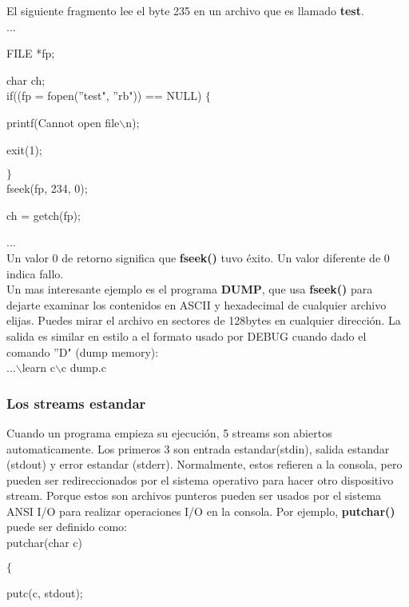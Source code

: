 \documentclass[]{article}
\begin{document}
	El siguiente fragmento lee el byte 235 en un archivo que es llamado \textbf{test}.\\
	
	...
	
	FILE *fp;
	
	char ch;\\
	
	if((fp = fopen(''test", ''rb")) == NULL) $\lbrace$
	
	printf(Cannot open file$\backslash$n);
	
	exit(1);
	
	$\rbrace$\\
	
	fseek(fp, 234, 0);
	
	ch = getch(fp);
	
	...\\
	
	Un valor 0 de retorno  significa que \textbf{fseek()} tuvo éxito. Un valor diferente de 0 indica fallo.\\
	
	Un mas interesante ejemplo es el programa \textbf{DUMP}, que usa \textbf{fseek()} para dejarte examinar los contenidos en ASCII y hexadecimal de cualquier archivo elijas. Puedes mirar el archivo en sectores de 128bytes en cualquier dirección. La salida es similar en estilo a el formato usado por DEBUG cuando dado el comando ''D" (dump memory):\\
	
	...$\backslash$learn c$\backslash$c dump.c\\
	
	\subsubsection{Los streams estandar}
	
	Cuando un programa empieza su ejecución, 5 streams son abiertos automaticamente. Los primeros 3 son entrada estandar(stdin), salida estandar (stdout) y error estandar (stderr). Normalmente, estos refieren a la consola, pero pueden ser redireccionados por el sistema operativo para hacer otro dispositivo stream. Porque estos son archivos punteros pueden ser usados por el sistema ANSI I/O para realizar operaciones I/O en la consola. Por ejemplo, \textbf{putchar()} puede ser definido como:\\
	
	putchar(char c)
	
	$\lbrace$
	
	putc(c, stdout);
	
\end{document}
